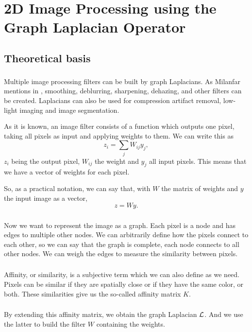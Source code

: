 \chapter{2D Image Processing using the Graph Laplacian Operator}

\section{Theoretical basis}

\paragraph{}
Multiple image processing filters can be built by graph Laplacians. As Milanfar mentions in \cite{siam_slides_2016}, smoothing, deblurring, sharpening, dehazing, and other filters can be created.
Laplacians can also be used for compression artifact removal, low-light imaging and image segmentation.

As it is known, an image filter consists of a function which outputs one pixel, taking all pixels as input and applying weights to them. We can write this as
\[z_i = \sum_j W_{ij}y_j,\]
\(z_i\) being the output pixel, \(W_{ij}\) the weight and \(y_j\) all input pixels.
This means that we have a vector of weights for each pixel.

So, as a practical notation, we can say that, with \(W\) the matrix of weights and \(y\) the input image as a vector,
\[z = Wy.\]

\paragraph{}
Now we want to represent the image as a graph.
Each pixel is a node and has edges to multiple other nodes.
We can arbitrarily define how the pixels connect to each other, so we can say that the graph is complete, each node connects to all other nodes.
We can weigh the edges to measure the similarity between pixels.

\paragraph{}
Affinity, or similarity, is a subjective term which we can also define as we need.
Pixels can be similar if they are spatially close or if they have the same color, or both.
These similarities give us the so-called affinity matrix \(K\).

\paragraph{}
By extending this affinity matrix, we obtain the graph Laplacian \(\operatorname{\mathcal{L}}\).
And we use the latter to build the filter \(W\) containing the weights.


